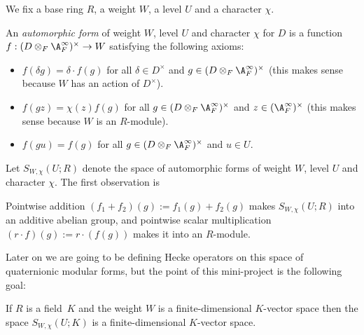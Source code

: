 We fix a base ring $R$, a weight $W$, a level $U$ and a character $\chi$.

\begin{definition}
  \label{TotallyDefiniteQuaternionAlgebra.AutomorphicForm}
  An \emph{automorphic form} of weight $W$, level $U$ and character $\chi$ for $D$ is
  a function $f:(D\otimes_F\A_F^\infty)^\times\to W$ satisfying the following axioms:
  \begin{itemize}
    \item $f(\delta g)=\delta\cdot f(g)$ for all $\delta\in D^\times$ and $g\in (D\otimes_F\A_F^\infty)^\times$
    (this makes sense because $W$ has an action of $D^\times$).
    \item $f(gz)=\chi(z)f(g)$ for all $g\in (D\otimes_F\A_F^\infty)^\times$ and $z\in(\A_F^\infty)^\times$
    (this makes sense because $W$ is an $R$-module).
    \item $f(gu)=f(g)$ for all $g\in (D\otimes_F\A_F^\infty)^\times$ and $u\in U$.
  \end{itemize}
\end{definition}

Let $S_{W,\chi}(U;R)$ denote the space of automorphic forms of weight $W$, level $U$ and character
$\chi$. The first observation is

\begin{definition}
  \label{TotallyDefiniteQuaternionAlgebra.AutomorphicForm.module}
  Pointwise addition $(f_1+f_2)(g):=f_1(g)+f_2(g)$ makes $S_{W,\chi}(U;R)$ into an additive
  abelian group, and pointwise scalar multiplication $(r\cdot f)(g):= r\cdot(f(g))$ makes
  it into an $R$-module.
\end{definition}

  Later on we are going to be defining Hecke operators on this space of quaternionic modular
  forms, but the point of this mini-project is the following goal:

\begin{theorem}
  \label{TotallyDefiniteQuaternionAlgebra.AutomorphicForm.finiteDimensional}
  If $R$ is a field~$K$ and the weight $W$ is a finite-dimensional $K$-vector space
  then the space $S_{W,\chi}(U;K)$ is a finite-dimensional $K$-vector space.
\end{theorem}

